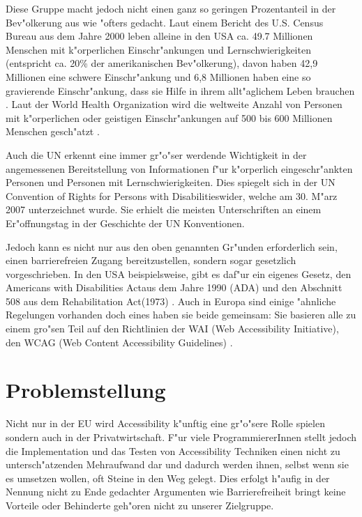 \documentclass[a4paper,bibtotoc,oneside]{scrbook}
\begin{document}
Diese Gruppe macht jedoch nicht einen ganz so geringen Prozentanteil in der Bev"olkerung aus wie "ofters gedacht. Laut einem Bericht des U.S. Census Bureau aus dem Jahre 2000 leben alleine in den USA ca. 49.7 Millionen Menschen mit k"orperlichen Einschr"ankungen und Lernschwierigkeiten (entspricht ca. 20\% der amerikanischen Bev"olkerung), davon haben 42,9 Millionen eine schwere Einschr"ankung und 6,8 Millionen haben eine so gravierende Einschr"ankung, dass sie Hilfe in ihrem allt"aglichem Leben brauchen \cite[S. 1]{us_cens}. Laut der World Health Organization wird die weltweite Anzahl von Personen mit k"orperlichen oder geistigen Einschr"ankungen auf 500 bis 600 Millionen Menschen gesch"atzt \cite{who_dis}.

Auch die UN erkennt eine immer gr"o"ser werdende Wichtigkeit in der angemessenen Bereitstellung von Informationen f"ur k"orperlich eingeschr"ankten Personen und Personen mit Lernschwierigkeiten. Dies spiegelt sich in der \glqq UN Convention of Rights for Persons with Disabilities\grqq wider, welche am 30. M"arz 2007 unterzeichnet wurde. Sie erhielt die \glqq meisten Unterschriften an einem Er"offnungstag in der Geschichte der UN Konventionen\grqq \cite{un_disabilities}. 

Jedoch kann es nicht nur aus den oben genannten Gr"unden erforderlich sein,
einen barrierefreien Zugang bereitzustellen, sondern sogar gesetzlich
vorgeschrieben. In den USA beispielsweise, gibt es daf"ur ein eigenes
Gesetz, den \glqq Americans with Disabilities Act\grqq aus dem Jahre 1990 (ADA) und den Abschnitt 508 aus dem \glqq Rehabilitation Act\grqq (1973) \cite[S. 288-289]{achieving_web_acc}. Auch in Europa sind einige "ahnliche Regelungen vorhanden \cite[S. 7]{mod_software} doch eines haben sie beide gemeinsam: Sie basieren alle zu einem gro"sen Teil auf den Richtlinien der WAI (Web Accessibility Initiative), den WCAG (Web Content Accessibility Guidelines) \cite[S. 289]{achieving_web_acc} \cite[S. 7]{mod_software}.

\section{Problemstellung}
Nicht nur in der EU wird Accessibility k"unftig eine gr"o"sere Rolle spielen \cite[Abschnitt EU]{w3c_pol} sondern auch in der Privatwirtschaft. F"ur viele ProgrammiererInnen stellt jedoch die Implementation und das Testen von Accessibility Techniken einen nicht zu untersch"atzenden Mehraufwand dar \cite[S. 27]{understand_acc} und dadurch werden ihnen, selbst wenn sie es umsetzen wollen, oft Steine in den Weg gelegt. Dies erfolgt h"aufig in der Nennung nicht zu Ende gedachter Argumenten wie \glqq Barrierefreiheit bringt keine Vorteile\grqq \cite[S. 28]{understand_acc} oder \glqq Behinderte geh"oren nicht zu unserer Zielgruppe\grqq \cite[S. 31]{understand_acc}.
\end{document}
